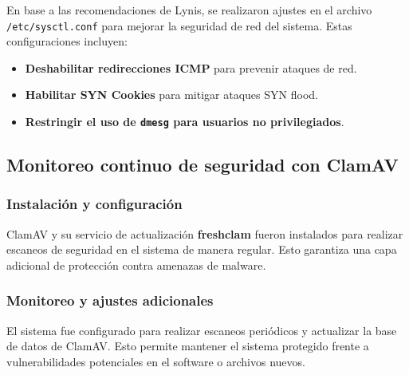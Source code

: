 En base a las recomendaciones de Lynis, se realizaron ajustes en el archivo \texttt{/etc/sysctl.conf} para mejorar la seguridad de red del sistema. Estas configuraciones incluyen:

\begin{itemize}
    \item \textbf{Deshabilitar redirecciones ICMP} para prevenir ataques de red.
    \item \textbf{Habilitar SYN Cookies} para mitigar ataques SYN flood.
    \item \textbf{Restringir el uso de \texttt{dmesg} para usuarios no privilegiados}.
\end{itemize}

\subsection{Monitoreo continuo de seguridad con ClamAV}

\subsubsection{Instalación y configuración}
ClamAV y su servicio de actualización \textbf{freshclam} fueron instalados para realizar escaneos de seguridad en el sistema de manera regular. Esto garantiza una capa adicional de protección contra amenazas de malware.

\subsubsection{Monitoreo y ajustes adicionales}
El sistema fue configurado para realizar escaneos periódicos y actualizar la base de datos de ClamAV. Esto permite mantener el sistema protegido frente a vulnerabilidades potenciales en el software o archivos nuevos.







































